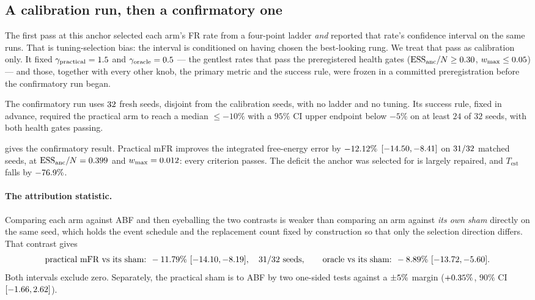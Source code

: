 \subsection{A calibration run, then a confirmatory one}
\label{sec:gw_confirm}
The first pass at this anchor selected each arm's FR rate from a four-point ladder
\emph{and} reported that rate's confidence interval on the same runs. That is
tuning-selection bias: the interval is conditioned on having chosen the best-looking rung. We
treat that pass as calibration only. It fixed
$\gamma_{\mathrm{practical}} = 1.5$ and $\gamma_{\mathrm{oracle}} = 0.5$
--- the gentlest rates that pass the preregistered health gates
($\mathrm{ESS}_{\mathrm{anc}}/N \ge 0.30$, $w_{\max} \le 0.05$) --- and those,
together with every other knob, the primary metric and the success rule, were frozen in a
committed preregistration before the confirmatory run began.

The confirmatory run uses $32$ fresh seeds, disjoint from the calibration seeds, with
no ladder and no tuning. Its success rule, fixed in advance, required the practical arm to
reach a median $\le -10\%$ with a $95\%$ CI upper endpoint below $-5\%$ on at least $24$ of
$32$ seeds, with both health gates passing.



 gives the confirmatory result. Practical mFR improves the integrated
free-energy error by $-12.12\%$ $[-14.50, -8.41]$ on $31/32$ matched
seeds, at $\mathrm{ESS}_{\mathrm{anc}}/N = 0.399$ and $w_{\max} = 0.012$: every
criterion passes. The deficit the anchor was selected for is largely repaired, and
$T_{\mathrm{est}}$ falls by $-76.9\%$.

\paragraph{The attribution statistic.} Comparing each arm against ABF and then eyeballing the
two contrasts is weaker than comparing an arm against \emph{its own sham} directly on the same
seed, which holds the event schedule and the replacement count fixed by construction so that
only the selection direction differs. That contrast gives
\begin{equation*}
  \text{practical mFR vs its sham: } -11.79\%\ [-14.10, -8.19],
  \quad 31/32 \text{ seeds},
  \qquad
  \text{oracle vs its sham: } -8.89\%\ [-13.72,
  -5.60].
\end{equation*}
Both intervals exclude zero. Separately, the practical sham is \textbf{\GwcShamTost} to ABF
by two one-sided tests against a $\pm5\%$ margin
($+0.35\%$, $90\%$ CI $[-1.66, 2.62]$).

